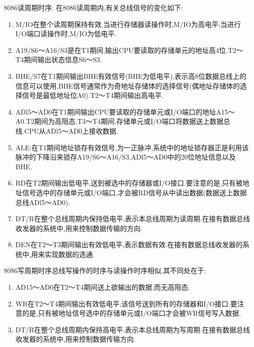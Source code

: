 8086读周期时序:
在8086读周期内,有关总线信号的变化如下:
\begin{enumerate}
\item M/IO在整个读周期保持有效,当进行存储器读操作时,M/IO为高电平;当进行I/O端口读操作时,M/IO为低电平.
\item A19/S6～A16/S3是在T1期间,输出CPU要读取的存储单元的地址高4位.T2～T4期间输出状态信息S6～S3.
\item BHE/S7在T1期间输出BHE有效信号(BHE为低电平),表示高8位数据总线上的信息可以使用,BHE信号通常作为奇地址存储体的选择信号(偶地址存储体的选择信号是最低地址位A0).T2～T4期间输出高电平.
\item ADl5～AD0在T1期间输出CPU要读取的存储单元或I/O端口的地址A15～A0.T2期间为高阻态,T3～T4期间,存储单元或I/O端口将数据送上数据总线.CPU从ADl5～AD0上接收数据.
\item ALE:在T1期间地址锁存有效信号,为一正脉冲,系统中的地址锁存器正是利用该脉冲的下降沿来锁存A19/S6～A16/S3,ADl5～AD0中的20位地址信息以及BHE.
\item RD在T2期间输出低电平,送到被选中的存储器或I/O接口.要注意的是,只有被地址信号选中的存储单元或I/O端口,才会被RD信号从中读出数据(数据送上数据总线ADl5～AD0).
\item DT/R在整个总线周期内保持低电平,表示本总线周期为读周期.在接有数据总线收发器的系统中,用来控制数据传输的方向.
\item DEN在T2～T3期间输出有效低电平,表示数据有效.在接有数据总线收发器的系统中,用来实现数据的选通.
\end{enumerate}

8086写周期时序总线写操作的时序与读操作时序相似,其不同处在于:
\begin{enumerate}
\item 	
AD15～AD0在T2～T4期间送上欲输出的数据,而无高阻态.
\item WR在T2～T4期间输出有效低电平,该信号送到所有的存储器和I/O接口.要注意的是,只有被地址信号选中的存储单元或I/O端口才会被WR信号写入数据.
\item DT/R在整个总线周期内保持高电平,表示本总线周期为写周期.在接有数据总线收发器的系统中,用来控制数据传输方向.
\end{enumerate}

%